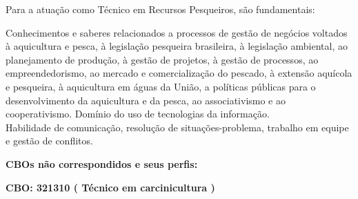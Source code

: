 \documentclass[
]{article}
\begin{document}
Para a atuação como Técnico em Recursos Pesqueiros, são fundamentais:

Conhecimentos e saberes relacionados a processos de gestão de negócios
voltados à aquicultura e pesca, à legislação pesqueira brasileira, à
legislação ambiental, ao planejamento de produção, à gestão de projetos,
à gestão de processos, ao empreendedorismo, ao mercado e comercialização
do pescado, à extensão aquícola e pesqueira, à aquicultura em águas da
União, a políticas públicas para o desenvolvimento da aquicultura e da
pesca, ao associativismo e ao cooperativismo. Domínio do uso de
tecnologias da informação.\\
Habilidade de comunicação, resolução de situações-problema, trabalho em
equipe e gestão de conflitos.

\textbf{CBOs não correspondidos e seus perfis:}

\textbf{CBO: 321310  ( Técnico em carcinicultura )}
\end{document}
